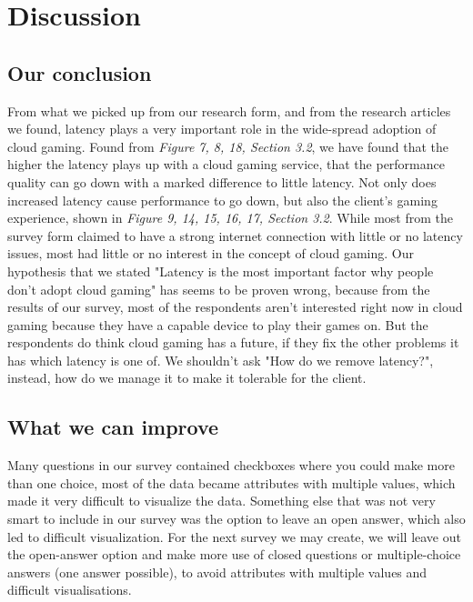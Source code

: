 \section{Discussion}

\subsection{Our conclusion}
From what we picked up from our research form, and from the research articles we found, latency plays a very important role in the wide-spread adoption of cloud gaming. Found from \textit{Figure 7, 8, 18, Section 3.2}, we have found that the higher the latency plays up with a cloud gaming service, that the performance quality can go down with a marked difference to little latency. Not only does increased latency cause performance to go down, but also the client's gaming experience, shown in \textit{Figure 9, 14, 15, 16, 17, Section 3.2}.
While most from the survey form claimed to have a strong internet connection with little or no latency issues, most had little or no interest in the concept of cloud gaming. Our hypothesis that we stated "Latency is the most important factor why people don't adopt cloud gaming" has seems to be proven wrong, because from the results of our survey, most of the respondents aren't interested right now in cloud gaming because they have a capable device to play their games on. But the respondents do think cloud gaming has a future, if they fix the other problems it has which latency is one of. We shouldn't ask "How do we remove latency?", instead, how do we manage it to make it tolerable for the client.
\subsection{What we can improve}
Many questions in our survey contained checkboxes where you could make more than one choice, most of the data became attributes with multiple values, which made it very difficult to visualize the data. Something else that was not very smart to include in our survey was the option to leave an open answer, which also led to difficult visualization. For the next survey we may create, we will leave out the open-answer option and make more use of closed questions or multiple-choice answers (one answer possible), to avoid attributes with multiple values and difficult visualisations.